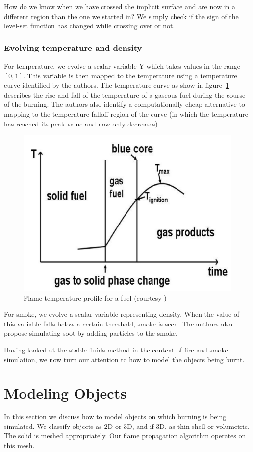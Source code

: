 \documentclass[12pt]{report}
\begin{document}
How do we know when we have crossed the implicit surface and are now in a different region than the one we started in? We simply check if the sign of the level-set function has changed while crossing over or not.

\subsection{Evolving temperature and density}

For temperature, we evolve a scalar variable Y which takes values in the range $[0, 1]$. This variable is then mapped to the temperature using a temperature curve identified by the authors. The temperature curve as show in figure~\ref{fig:tempcurve} describes the rise and fall of the temperature of a gaseous fuel during the course of the burning. The authors also identify a computationally cheap alternative to mapping to the temperature falloff region of the curve (in which the temperature has reached its peak value and now only decreases).

\begin{figure}[H]
\centering
\includegraphics[width=.5\linewidth]{img/temperature}
\caption{Flame temperature profile for a fuel (courtesy \cite{ngfeje})}
\label{fig:tempcurve}
\end{figure}

For smoke, we evolve a scalar variable representing density. When the value of this variable falls below a certain threshold, smoke is seen. The authors also propose simulating soot by adding particles to the smoke.

Having looked at the stable fluids method in the context of fire and smoke simulation, we now turn our attention to how to model the objects being burnt.

\chapter{Modeling Objects}

In this section we discuss how to model objects on which burning is being simulated. We classify objects as 2D or 3D, and if 3D, as thin-shell or volumetric. The solid is meshed appropriately. Our flame propagation algorithm operates on this mesh.
\end{document}
